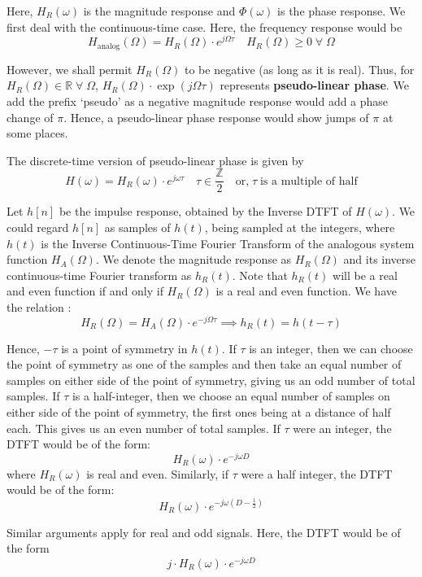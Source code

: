 \documentclass{article}
\theoremstyle{definition}
\begin{document}
Here, $H_R(\omega)$ is the magnitude response and $\Phi(\omega)$ is the phase response. We first deal with the continuous-time case. Here, the frequency response would be 
\[
    H_{\text{analog}}(\Omega) = H_R(\Omega) \cdot e^{j \Omega \tau} \quad H_R(\Omega) \geq 0 \; \forall \; \Omega
\]

However, we shall permit $H_R(\Omega)$ to be negative (as long as it is real). Thus, for $H_R(\Omega) \in \mathbb{R} \; \forall \; \Omega$, $H_R(\Omega) \cdot \exp (j \Omega \tau)$ represents \textbf{pseudo-linear phase}. We add the prefix `pseudo' as a negative magnitude response would add a phase change of $\pi$. Hence, a pseudo-linear phase response would show jumps of $\pi$ at some places. \medskip

The discrete-time version of pseudo-linear phase is given by
\[
    H(\omega) = H_R(\omega) \cdot e^{j \omega \tau} \quad \tau \in \frac{\mathbb{Z}}{2} \quad \text{or,} \; \tau \; \text{is a multiple of half}
\]

Let $h[n]$ be the impulse response, obtained by the Inverse DTFT of $H(\omega)$. We could regard $h[n]$ as samples of $h(t)$, being sampled at the integers, where $h(t)$ is the Inverse Continuous-Time Fourier Transform of the analogous system function $H_A(\Omega)$. We denote the magnitude response as $H_R(\Omega)$ and its inverse continuous-time Fourier transform as $h_R(t)$. Note that $h_R(t)$ will be a real and even function if and only if $H_R(\Omega)$ is a real and even function. We have the relation :
\[
    H_R(\Omega) = H_A(\Omega) \cdot e^{-j \Omega \tau} \implies h_R(t) = h(t - \tau)
\]

Hence, $-\tau$ is a point of symmetry in $h(t)$. If $\tau$ is an integer, then we can choose the point of symmetry as one of the samples and then take an equal number of samples on either side of the point of symmetry, giving us an odd number of total samples. If $\tau$ is a half-integer, then we choose an equal number of samples on either side of the point of symmetry, the first ones being at a distance of half each. This gives us an even number of total samples. If $\tau$ were an integer, the DTFT would be of the form:
\[
    H_R(\omega) \cdot e^{-j\omega D}
\]
where $H_R(\omega)$ is real and even. Similarly, if $\tau$ were a half integer, the DTFT would be of the form:
\[
    H_R(\omega) \cdot e^{-j \omega \left(D - \frac{1}{2} \right)}
\]

Similar arguments apply for real and odd signals. Here, the DTFT would be of the form 
\[
    j \cdot H_R(\omega) \cdot e^{-j\omega D}
\]
\end{document}
